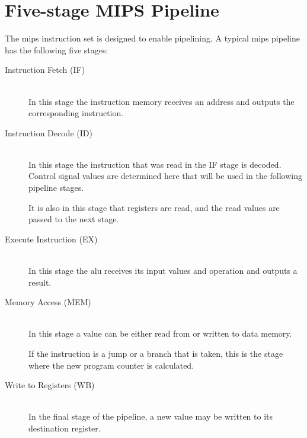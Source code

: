 \section{Five-stage MIPS Pipeline}
The \gls{mips} instruction set is designed to enable pipelining.
A typical \gls{mips} pipeline has the following five stages:
\begin{description}
    \item[Instruction Fetch (IF)]
        \hfill\\
        In this stage the instruction memory receives an address and outputs the corresponding instruction.
    \item[Instruction Decode (ID)]
        \hfill\\
        In this stage the instruction that was read in the IF stage is decoded.
        Control signal values are determined here that will be used in the following pipeline stages.

        It is also in this stage that registers are read,
        and the read values are passed to the next stage.
    \item[Execute Instruction (EX)]
        \hfill\\
        In this stage the \gls{alu} receives its input values and operation and outputs a result.
    \item[Memory Access (MEM)]
        \hfill\\
        In this stage a value can be either read from or written to data memory.

        If the instruction is a jump or a branch that is taken,
        this is the stage where the new program counter is calculated.
    \item[Write to Registers (WB)]
        \hfill\\
        In the final stage of the pipeline, a new value may be written to its destination register.
\end{description}

